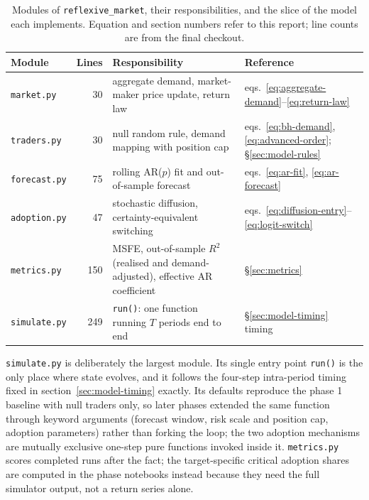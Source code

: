 \documentclass[12pt]{article}
\begin{document}
\begin{table}[h]
\centering
\caption{Modules of \texttt{reflexive\_market}, their responsibilities, and the slice of the model each implements. Equation and section numbers refer to this report; line counts are from the final checkout.} %
\label{tab:modules}
\begin{tabularx}{\textwidth}{@{}l r X l@{}}
\toprule
Module & Lines & Responsibility & Reference \\
\midrule
\texttt{market.py}   & 30  & aggregate demand, market-maker price update, return law & eqs.\ \eqref{eq:aggregate-demand}--\eqref{eq:return-law} \\
\texttt{traders.py}  & 30  & null random rule, demand mapping with position cap & eqs.\ \eqref{eq:bh-demand}, \eqref{eq:advanced-order}; \S\ref{sec:model-rules} \\
\texttt{forecast.py} & 75  & rolling AR($p$) fit and out-of-sample forecast & eqs.\ \eqref{eq:ar-fit}, \eqref{eq:ar-forecast} \\
\texttt{adoption.py} & 47  & stochastic diffusion, certainty-equivalent switching & eqs.\ \eqref{eq:diffusion-entry}--\eqref{eq:logit-switch} \\
\texttt{metrics.py}  & 150 & MSFE, out-of-sample $R^{2}$ (realised and demand-adjusted), effective AR coefficient & \S\ref{sec:metrics} \\
\texttt{simulate.py} & 249 & \texttt{run()}: one function running $T$ periods end to end & \S\ref{sec:model-timing} timing \\
\bottomrule
\end{tabularx}
\end{table}

\texttt{simulate.py} is deliberately the largest module. Its single entry point \texttt{run()} is the only place where state evolves, and it follows the four-step intra-period timing fixed in section~\ref{sec:model-timing} exactly. %
Its defaults reproduce the phase 1 baseline with null traders only, so later phases extended the same function through keyword arguments (forecast window, risk scale and position cap, adoption parameters) rather than forking the loop; the two adoption mechanisms are mutually exclusive one-step pure functions invoked inside it. %
\texttt{metrics.py} scores completed runs after the fact; the target-specific critical adoption shares are computed in the phase notebooks instead because they need the full simulator output, not a return series alone. %
\end{document}
